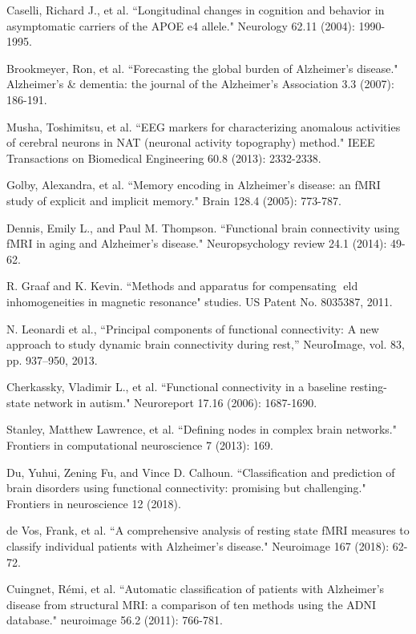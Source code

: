 \documentclass[journal]{IEEEtran}
\begin{document}
	\begin{thebibliography}{1}
		
		Caselli, Richard J., et al. ``Longitudinal changes in cognition and behavior in asymptomatic carriers of the APOE e4 allele." Neurology 62.11 (2004): 1990-1995.
		
		Brookmeyer, Ron, et al. ``Forecasting the global burden of Alzheimer’s disease." Alzheimer's \& dementia: the journal of the Alzheimer's Association 3.3 (2007): 186-191.
		
		Musha, Toshimitsu, et al. ``EEG markers for characterizing anomalous activities of cerebral neurons in NAT (neuronal activity topography) method." IEEE Transactions on Biomedical Engineering 60.8 (2013): 2332-2338.
		
		Golby, Alexandra, et al. ``Memory encoding in Alzheimer's disease: an fMRI study of explicit and implicit memory." Brain 128.4 (2005): 773-787.
		
		Dennis, Emily L., and Paul M. Thompson. ``Functional brain connectivity using fMRI in aging and Alzheimer’s disease." Neuropsychology review 24.1 (2014): 49-62.
		
		R. Graaf and K. Kevin. ``Methods and apparatus for
		compensating eld inhomogeneities in magnetic resonance"
		studies. US Patent No. 8035387, 2011.
		
		
		N. Leonardi et al., “Principal components of functional connectivity: A
		new approach to study dynamic brain connectivity during rest,” NeuroImage,
		vol. 83, pp. 937–950, 2013.
		
		Cherkassky, Vladimir L., et al. ``Functional connectivity in a baseline resting-state network in autism." Neuroreport 17.16 (2006): 1687-1690.
		
		Stanley, Matthew Lawrence, et al. ``Defining nodes in complex brain networks." Frontiers in computational neuroscience 7 (2013): 169.
		
		Du, Yuhui, Zening Fu, and Vince D. Calhoun. ``Classification and prediction of brain disorders using functional connectivity: promising but challenging." Frontiers in neuroscience 12 (2018).
		
		de Vos, Frank, et al. ``A comprehensive analysis of resting state fMRI measures to classify individual patients with Alzheimer's disease." Neuroimage 167 (2018): 62-72.
		
		Cuingnet, Rémi, et al. ``Automatic classification of patients with Alzheimer's disease from structural MRI: a comparison of ten methods using the ADNI database." neuroimage 56.2 (2011): 766-781.
		

\end{thebibliography}
\end{document}
